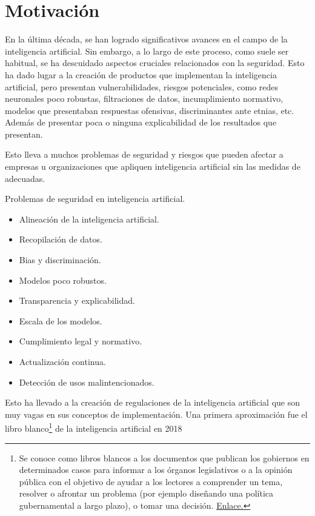 \section{Motivación}

En la última década, se han logrado significativos avances en el campo de la inteligencia artificial. Sin embargo, a lo largo de este proceso, como suele ser habitual, se ha descuidado  aspectos cruciales relacionados con la seguridad. Esto ha dado lugar a la creación de productos que implementan la inteligencia artificial, pero presentan vulnerabilidades, riesgos potenciales, como redes neuronales poco robustas, filtraciones de datos, incumplimiento normativo, modelos que presentaban respuestas ofensivas, discriminantes ante etnias, etc. Además de presentar poca o ninguna explicabilidad de los resultados que presentan.

Esto lleva a muchos problemas de seguridad y riesgos que pueden afectar a empresas u organizaciones que apliquen inteligencia artificial sin las medidas de adecuadas.

Problemas de seguridad en inteligencia artificial.

\begin{itemize}
    \item Alineación de la inteligencia artificial.
    \item Recopilación de datos.
    \item Bias y discriminación.
    \item Modelos poco robustos.
    \item Transparencia y explicabilidad.
    \item Escala de los modelos.
    \item Cumplimiento legal y normativo.
    \item Actualización continua.
    \item Detección de usos malintencionados.
\end{itemize}

Esto ha llevado a la creación de regulaciones de la inteligencia artificial que son muy vagas en sus conceptos de implementación.
Una primera aproximación fue el libro blanco\footnote{Se conoce como libros blancos a los documentos que publican los gobiernos en determinados casos para informar a los órganos legislativos o a la opinión pública con el objetivo de ayudar a los lectores a comprender un tema, resolver o afrontar un problema (por ejemplo diseñando una política gubernamental a largo plazo), o tomar una decisión. \href{https://es.wikipedia.org/wiki/Libro_blanco}{Enlace.}} de la inteligencia artificial en 2018 \cite{whitebook2020AI}

